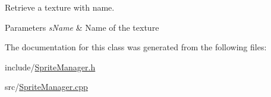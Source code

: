 Retrieve a texture with name. 


\begin{DoxyParams}{Parameters}
{\em s\+Name} & Name of the texture \\
\hline
\end{DoxyParams}


The documentation for this class was generated from the following files\+:\begin{DoxyCompactItemize}
\item 
include/\hyperlink{_sprite_manager_8h}{Sprite\+Manager.\+h}\item 
src/\hyperlink{_sprite_manager_8cpp}{Sprite\+Manager.\+cpp}\end{DoxyCompactItemize}
